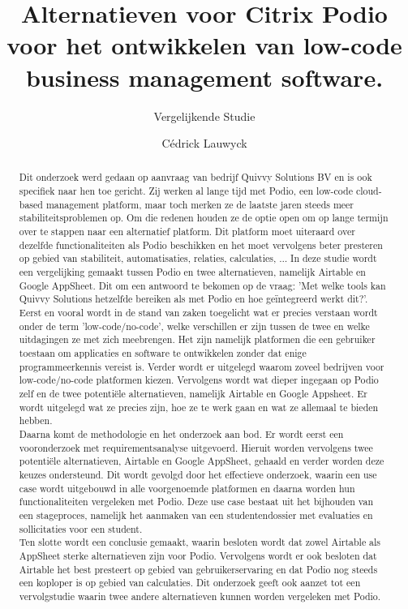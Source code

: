 \documentclass[a0,portrait]{hogent-poster}
\title{Alternatieven voor Citrix Podio voor het ontwikkelen van low-code business management software.}
\subtitle{Vergelijkende Studie}
\author{Cédrick Lauwyck}
\begin{document}
\maketitle

\begin{abstract}
    
Dit onderzoek werd gedaan op aanvraag van bedrijf Quivvy Solutions BV en is ook specifiek naar hen toe gericht. Zij werken al lange tijd met Podio, een low-code cloud-based management platform, maar toch merken ze de laatste jaren steeds meer stabiliteitsproblemen op. Om die redenen houden ze de optie open om op lange termijn over te stappen naar een alternatief platform. Dit platform moet uiteraard over dezelfde functionaliteiten als Podio beschikken en het moet vervolgens beter presteren op gebied van stabiliteit, automatisaties, relaties, calculaties, $\ldots$ In deze studie wordt een vergelijking gemaakt tussen Podio en twee alternatieven, namelijk Airtable en Google AppSheet. Dit om een antwoord te bekomen op de vraag: 'Met welke tools kan Quivvy Solutions hetzelfde bereiken als met Podio en hoe geïntegreerd werkt dit?'. \\

Eerst en vooral wordt in de stand van zaken toegelicht wat er precies verstaan wordt onder de term 'low-code/no-code', welke verschillen er zijn tussen de twee en welke uitdagingen ze met zich meebrengen. Het zijn namelijk platformen die een gebruiker toestaan om applicaties en software te ontwikkelen zonder dat enige programmeerkennis vereist is. Verder wordt er uitgelegd waarom zoveel bedrijven voor low-code/no-code platformen kiezen. Vervolgens wordt wat dieper ingegaan op Podio zelf en de twee potentiële alternatieven, namelijk Airtable en Google Appsheet. Er wordt uitgelegd wat ze precies zijn, hoe ze te werk gaan en wat ze allemaal te bieden hebben. \\

Daarna komt de methodologie en het onderzoek aan bod. Er wordt eerst een vooronderzoek met requirementsanalyse uitgevoerd. Hieruit worden vervolgens twee potentiële alternatieven, Airtable en Google AppSheet, gehaald en verder worden deze keuzes ondersteund. Dit wordt gevolgd door het effectieve onderzoek, waarin een use case wordt uitgebouwd in alle voorgenoemde platformen en daarna worden hun functionaliteiten vergeleken met Podio. Deze use case bestaat uit het bijhouden van een stageproces, namelijk het aanmaken van een studentendossier met evaluaties en sollicitaties voor een student. \\ 

Ten slotte wordt een conclusie gemaakt, waarin besloten wordt dat zowel Airtable als AppSheet sterke alternatieven zijn voor Podio. Vervolgens wordt er ook besloten dat Airtable het best presteert op gebied van gebruikerservaring en dat Podio nog steeds een koploper is op gebied van calculaties. Dit onderzoek geeft ook aanzet tot een vervolgstudie waarin twee andere alternatieven kunnen worden vergeleken met Podio. \\

\end{abstract}
\end{document}
